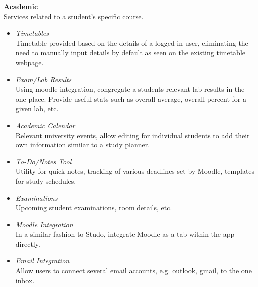 \textbf{Academic}\\
Services related to a student's specific course.
\begin{itemize}
  \item \textit{Timetables}\\
         Timetable provided based on the details of a logged in user, eliminating the need to manually input details by default as seen on the existing timetable webpage.
  \item \textit{Exam/Lab Results}\\
         Using moodle integration, congregate a students relevant lab results in the one place. Provide useful stats such as overall average, overall percent for a given lab, etc.
  \item \textit{Academic Calendar}\\
        Relevant university events, allow editing for individual students to add their own information similar to a study planner.
   \item \textit{To-Do/Notes Tool}\\
         Utility for quick notes, tracking of various deadlines set by Moodle, templates for study schedules.
  \item \textit{Examinations}\\
        Upcoming student examinations, room details, etc.
  \item \textit{Moodle Integration}\\
        In a similar fashion to Studo, integrate Moodle as a tab within the app directly. 
  \item \textit{Email Integration}\\
        Allow users to connect several email accounts, e.g. outlook, gmail, to the one inbox.
\end{itemize}

